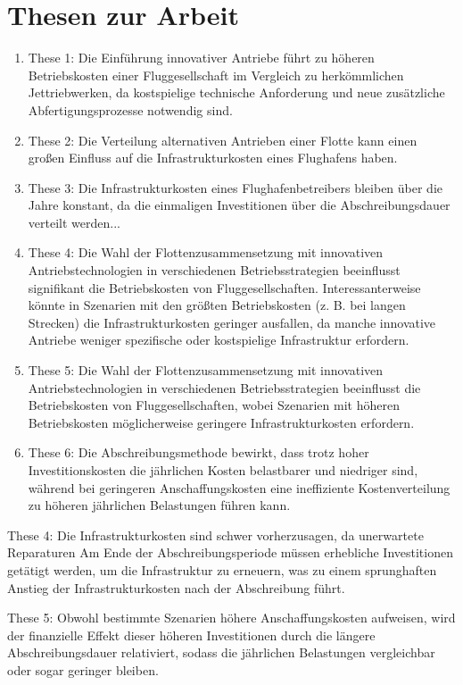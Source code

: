 \chapter*{Thesen zur Arbeit}
\label{ch:Thesen}
\thispagestyle{empty}

\begin{enumerate}
    \item These 1: Die Einführung innovativer Antriebe führt zu höheren Betriebskosten einer Fluggesellschaft im Vergleich zu herkömmlichen
    Jettriebwerken, da kostspielige technische Anforderung und neue zusätzliche Abfertigungsprozesse notwendig sind.
    \item These 2: Die Verteilung alternativen Antrieben einer Flotte kann einen großen Einfluss auf die Infrastrukturkosten eines Flughafens haben.
    \item These 3: Die Infrastrukturkosten eines Flughafenbetreibers bleiben über die Jahre konstant, 
    da die einmaligen Investitionen über die Abschreibungsdauer verteilt werden...
    
    \item These 4: Die Wahl der Flottenzusammensetzung mit innovativen Antriebstechnologien in verschiedenen 
    Betriebsstrategien beeinflusst signifikant die Betriebskosten von Fluggesellschaften. 
    Interessanterweise könnte in Szenarien mit den größten Betriebskosten (z. B. bei langen Strecken) die Infrastrukturkosten geringer ausfallen, 
    da manche innovative Antriebe weniger spezifische oder kostspielige Infrastruktur erfordern.
    \item These 5: Die Wahl der Flottenzusammensetzung mit innovativen Antriebstechnologien in verschiedenen 
    Betriebsstrategien beeinflusst die Betriebskosten von Fluggesellschaften, wobei Szenarien mit höheren 
    Betriebskosten möglicherweise geringere Infrastrukturkosten erfordern.
    \item These 6: Die Abschreibungsmethode bewirkt, dass trotz hoher Investitionskosten die jährlichen Kosten belastbarer 
    und niedriger sind, während bei geringeren Anschaffungskosten eine ineffiziente Kostenverteilung zu 
    höheren jährlichen Belastungen führen kann.
\end{enumerate}

These 4: Die Infrastrukturkosten sind schwer vorherzusagen, da unerwartete Reparaturen 
Am Ende der Abschreibungsperiode müssen erhebliche Investitionen getätigt werden, um die Infrastruktur zu erneuern, 
was zu einem sprunghaften Anstieg der Infrastrukturkosten nach der Abschreibung führt.

These 5: Obwohl bestimmte Szenarien höhere Anschaffungskosten aufweisen, 
    wird der finanzielle Effekt dieser höheren Investitionen durch die längere Abschreibungsdauer relativiert, 
    sodass die jährlichen Belastungen vergleichbar oder sogar geringer bleiben.